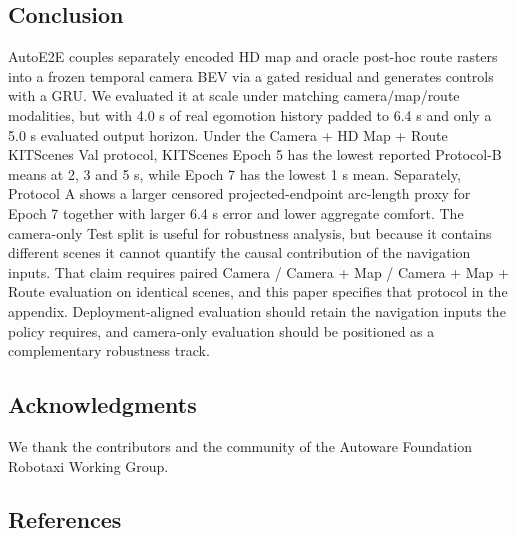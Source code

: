 \documentclass[
  english,
  10pt,
]{article}
\begin{document}
\subsection{Conclusion}\label{conclusion}

AutoE2E couples separately encoded HD map and oracle post-hoc route
rasters into a frozen temporal camera BEV via a gated residual and
generates controls with a GRU. We evaluated it at scale under matching
camera/map/route modalities, but with 4.0 s of real egomotion history
padded to 6.4 s and only a 5.0 s evaluated output horizon. Under the
Camera + HD Map + Route KITScenes Val protocol, KITScenes Epoch 5 has
the lowest reported Protocol-B means at 2, 3 and 5 s, while Epoch 7 has
the lowest 1 s mean. Separately, Protocol A shows a larger censored
projected-endpoint arc-length proxy for Epoch 7 together with larger 6.4
s error and lower aggregate comfort. The camera-only Test split is
useful for robustness analysis, but because it contains different scenes
it cannot quantify the causal contribution of the navigation inputs.
That claim requires paired Camera / Camera + Map / Camera + Map + Route
evaluation on identical scenes, and this paper specifies that protocol
in the appendix. Deployment-aligned evaluation should retain the
navigation inputs the policy requires, and camera-only evaluation should
be positioned as a complementary robustness track.

\subsection{Acknowledgments}\label{acknowledgments}

We thank the contributors and the community of the Autoware Foundation
Robotaxi Working Group.

\subsection{References}\label{references}
\end{document}
